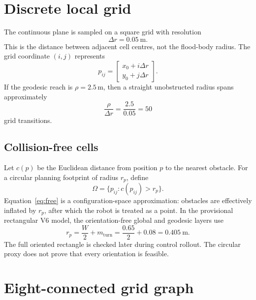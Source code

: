 \documentclass[11pt,a4paper]{article}
\newcommand{\Free}{\Omega}
\begin{document}
\section{Discrete local grid}

The continuous plane is sampled on a square grid with resolution
\begin{equation}
  \Delta r = 0.05\ \mathrm{m}.
\end{equation}
This is the distance between adjacent cell centres, not the flood-body radius.
The grid coordinate $(i,j)$ represents
\begin{equation}
  p_{ij}=
  \begin{bmatrix}
  x_0+i\Delta r\\ y_0+j\Delta r
  \end{bmatrix}.
\end{equation}
If the geodesic reach is $\rho=2.5\,\mathrm{m}$, then a straight unobstructed
radius spans approximately
\begin{equation}
  \frac{\rho}{\Delta r}=\frac{2.5}{0.05}=50
\end{equation}
grid transitions.

\subsection{Collision-free cells}

Let $c(p)$ be the Euclidean distance from position $p$ to the nearest
obstacle. For a circular planning footprint of radius $r_p$, define
\begin{equation}
  \Free=\{p_{ij}:c(p_{ij})>r_p\}.
  \label{eq:free}
\end{equation}
Equation~\eqref{eq:free} is a configuration-space approximation: obstacles
are effectively inflated by $r_p$, after which the robot is treated as a
point. In the provisional rectangular V6 model, the orientation-free global
and geodesic layers use
\begin{equation}
  r_p=\frac{W}{2}+m_{\mathrm{turn}}
      =\frac{0.65}{2}+0.08=0.405\ \mathrm{m}.
\end{equation}
The full oriented rectangle is checked later during control rollout. The
circular proxy does not prove that every orientation is feasible.

\section{Eight-connected grid graph}
\end{document}
